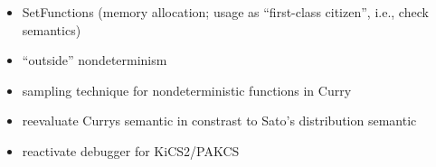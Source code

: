 \documentclass[
12pt, %
a4paper, %
oneside, %
]{llncs}
\begin{document}
\begin{itemize}
\item SetFunctions (memory allocation; usage as ``first-class
  citizen'', i.e., check semantics)
\item ``outside'' nondeterminism
\item sampling technique for nondeterministic functions in Curry
\item reevaluate Currys semantic in constrast to Sato's distribution
  semantic
\item reactivate debugger for KiCS2/PAKCS
\end{itemize}



\end{document}
